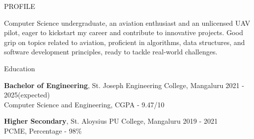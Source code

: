 \documentclass{resume} %
\begin{document}

\begin{rSection}{PROFILE}

{
    Computer Science undergraduate, an aviation enthusiast and an unlicensed UAV pilot, eager to kickstart my
career and contribute to innovative projects. Good grip on topics related to aviation, proficient in algorithms,
data structures, and software development principles, ready to tackle real-world challenges.

}

\end{rSection}

\begin{rSection}{Education}

{\bf Bachelor of Engineering}, St. Joseph Engineering College, Mangaluru \hfill {2021 - 2025(expected)}\\
Computer Science and Engineering, CGPA - 9.47/10

{\bf Higher Secondary}, St. Aloysius PU College, Mangaluru \hfill {2019 - 2021}\\
PCME, Percentage - 98\%



\end{rSection}
\end{document}
